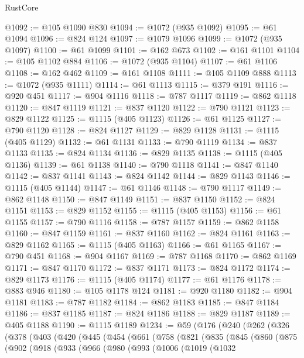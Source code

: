 \begin{lexlean}{RustCore}
\begin{coremodule}
{\begin{coremodule}
{{{{{{{{{{{{{{{{{{{{{{{{{{{{{{{{{{{{{{{{{{{{{@1092 := @105 @1090 @830
@1094 := @1072 (@935 @1092)
@1095 := @61 @1094
@1096 := @824 @124
@1097 := @1079 @1096
@1099 := @1072 (@935 @1097)
@1100 := @61 @1099
@1101 := @162 @673
@1102 := @161 @1101
@1104 := @105 @1102 @884
@1106 := @1072 (@935 @1104)
@1107 := @61 @1106
@1108 := @162 @462
@1109 := @161 @1108
@1111 := @105 @1109 @888
@1113 := @1072 (@935 @1111)
@1114 := @61 @1113
@1115 := @379 @191
@1116 := @920 @451
@1117 := @904 @1116
@1118 := @787 @1117
@1119 := @862 @1118
@1120 := @847 @1119
@1121 := @837 @1120
@1122 := @790 @1121
@1123 := @829 @1122
@1125 := @1115 (@405 @1123)
@1126 := @61 @1125
@1127 := @790 @1120
@1128 := @824 @1127
@1129 := @829 @1128
@1131 := @1115 (@405 @1129)
@1132 := @61 @1131
@1133 := @790 @1119
@1134 := @837 @1133
@1135 := @824 @1134
@1136 := @829 @1135
@1138 := @1115 (@405 @1136)
@1139 := @61 @1138
@1140 := @790 @1118
@1141 := @847 @1140
@1142 := @837 @1141
@1143 := @824 @1142
@1144 := @829 @1143
@1146 := @1115 (@405 @1144)
@1147 := @61 @1146
@1148 := @790 @1117
@1149 := @862 @1148
@1150 := @847 @1149
@1151 := @837 @1150
@1152 := @824 @1151
@1153 := @829 @1152
@1155 := @1115 (@405 @1153)
@1156 := @61 @1155
@1157 := @790 @1116
@1158 := @787 @1157
@1159 := @862 @1158
@1160 := @847 @1159
@1161 := @837 @1160
@1162 := @824 @1161
@1163 := @829 @1162
@1165 := @1115 (@405 @1163)
@1166 := @61 @1165
@1167 := @790 @451
@1168 := @904 @1167
@1169 := @787 @1168
@1170 := @862 @1169
@1171 := @847 @1170
@1172 := @837 @1171
@1173 := @824 @1172
@1174 := @829 @1173
@1176 := @1115 (@405 @1174)
@1177 := @61 @1176
@1178 := @883 @946
@1180 := @105 @1178 @124
@1181 := @920 @1180
@1182 := @904 @1181
@1183 := @787 @1182
@1184 := @862 @1183
@1185 := @847 @1184
@1186 := @837 @1185
@1187 := @824 @1186
@1188 := @829 @1187
@1189 := @405 @1188
@1190 := @1115 @1189
@1234 := @59
    (@176
      (@240
        (@262
          (@326
            (@378
              (@403
                (@420
                  (@445
                    (@454
                      (@661
                        (@758
                          (@821
                            (@835
                              (@845
                                (@860
                                  (@875
                                    (@902
                                      (@918
                                        (@933
                                          (@966
                                            (@980
                                              (@993
                                                (@1006
                                                  (@1019
                                                    (@1032
}}}}}}}}}}}}}}}}}}}}}}}}}}}}}}}}}}}}}}}}}}}}}
\end{coremodule}}
\end{coremodule}
\end{lexlean}
